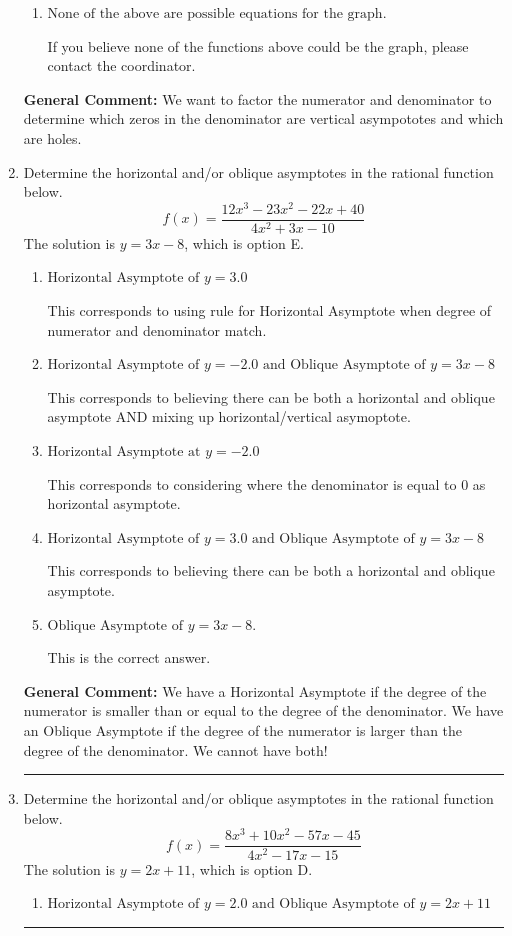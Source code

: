 \documentclass{extbook}[14pt]
\newcommand{\litem}[1]{\item #1

\rule{\textwidth}{0.4pt}}
\begin{document}
\begin{enumerate}
{\begin{enumerate}[label=\Alph*.]
Remember that factors are written as $x-z$. For example, the zero $x=-1$ corresponds to the factor $x-(-1)$.
\item \( \text{None of the above are possible equations for the graph.} \)

If you believe none of the functions above could be the graph, please contact the coordinator.
\end{enumerate}

\textbf{General Comment:} We want to factor the numerator and denominator to determine which zeros in the denominator are vertical asympototes and which are holes.
}
\litem{
Determine the horizontal and/or oblique asymptotes in the rational function below.
\[ f(x) = \frac{12x^{3} -23 x^{2} -22 x + 40}{4x^{2} +3 x -10} \]The solution is \( y = 3x -8 \), which is option E.\begin{enumerate}[label=\Alph*.]
\item \( \text{Horizontal Asymptote of } y = 3.0  \)

This corresponds to using rule for Horizontal Asymptote when degree of numerator and denominator match.
\item \( \text{Horizontal Asymptote of } y = -2.0 \text{ and Oblique Asymptote of } y = 3x -8 \)

This corresponds to believing there can be both a horizontal and oblique asymptote AND mixing up horizontal/vertical asymoptote.
\item \( \text{Horizontal Asymptote at } y = -2.0 \)

This corresponds to considering where the denominator is equal to 0 as horizontal asymptote.
\item \( \text{Horizontal Asymptote of } y = 3.0 \text{ and Oblique Asymptote of } y = 3x -8 \)

This corresponds to believing there can be both a horizontal and oblique asymptote.
\item \( \text{Oblique Asymptote of } y = 3x -8. \)

This is the correct answer.
\end{enumerate}

\textbf{General Comment:} We have a Horizontal Asymptote if the degree of the numerator is smaller than or equal to the degree of the denominator. We have an Oblique Asymptote if the degree of the numerator is larger than the degree of the denominator. We cannot have both!
}
\litem{
Determine the horizontal and/or oblique asymptotes in the rational function below.
\[ f(x) = \frac{8x^{3} +10 x^{2} -57 x -45}{4x^{2} -17 x -15} \]The solution is \( y = 2x + 11 \), which is option D.\begin{enumerate}[label=\Alph*.]
\item \( \text{Horizontal Asymptote of } y = 2.0 \text{ and Oblique Asymptote of } y = 2x + 11 \)


\end{enumerate}}
\end{enumerate}
\end{document}

